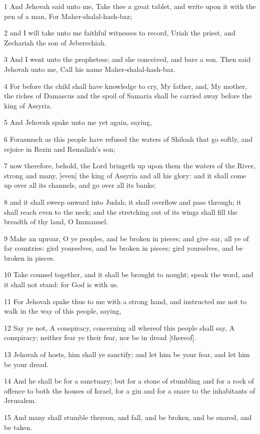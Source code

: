 \par 1 And Jehovah said unto me, Take thee a great tablet, and write upon it with the pen of a man, For Maher-shalal-hash-baz;
\par 2 and I will take unto me faithful witnesses to record, Uriah the priest, and Zechariah the son of Jeberechiah.
\par 3 And I went unto the prophetess; and she conceived, and bare a son. Then said Jehovah unto me, Call his name Maher-shalal-hash-baz.
\par 4 For before the child shall have knowledge to cry, My father, and, My mother, the riches of Damascus and the spoil of Samaria shall be carried away before the king of Assyria.
\par 5 And Jehovah spake unto me yet again, saying,
\par 6 Forasmuch as this people have refused the waters of Shiloah that go softly, and rejoice in Rezin and Remaliah's son;
\par 7 now therefore, behold, the Lord bringeth up upon them the waters of the River, strong and many, [even] the king of Assyria and all his glory: and it shall come up over all its channels, and go over all its banks;
\par 8 and it shall sweep onward into Judah; it shall overflow and pass through; it shall reach even to the neck; and the stretching out of its wings shall fill the breadth of thy land, O Immanuel.
\par 9 Make an uproar, O ye peoples, and be broken in pieces; and give ear, all ye of far countries: gird yourselves, and be broken in pieces; gird yourselves, and be broken in pieces.
\par 10 Take counsel together, and it shall be brought to nought; speak the word, and it shall not stand: for God is with us.
\par 11 For Jehovah spake thus to me with a strong hand, and instructed me not to walk in the way of this people, saying,
\par 12 Say ye not, A conspiracy, concerning all whereof this people shall say, A conspiracy; neither fear ye their fear, nor be in dread [thereof].
\par 13 Jehovah of hosts, him shall ye sanctify; and let him be your fear, and let him be your dread.
\par 14 And he shall be for a sanctuary; but for a stone of stumbling and for a rock of offence to both the houses of Israel, for a gin and for a snare to the inhabitants of Jerusalem.
\par 15 And many shall stumble thereon, and fall, and be broken, and be snared, and be taken.
